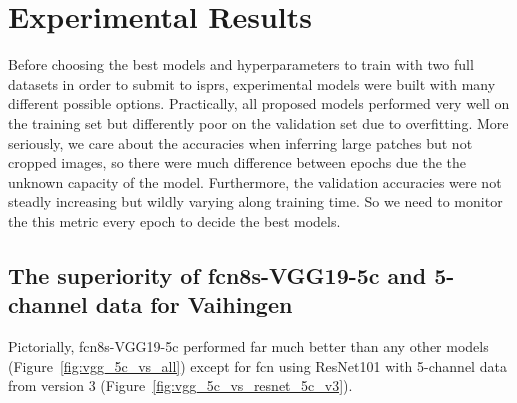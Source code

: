 \section{Experimental Results}
Before choosing the best models and hyperparameters to train with two full
datasets in order to submit to \acrshort{isprs}, experimental models were built
with many different possible options. Practically, all proposed models performed
very well on the training set but differently poor on the validation set due to
overfitting. More seriously, we care about the accuracies when inferring large
patches but not cropped images, so there were much difference between epochs
due the the unknown capacity of the model. Furthermore, the validation
accuracies were not steadly increasing but wildly varying along training time.
So we need to monitor the this metric every epoch to decide the best models.

\subsection{The superiority of \acrshort{fcn}8s-VGG19-5c and 5-channel data for
Vaihingen}
Pictorially, \acrshort{fcn}8s-VGG19-5c performed far much better than any
other models (Figure~\ref{fig:vgg_5c_vs_all}) except for \acrshort{fcn} using
ResNet101 with 5-channel data from version 3
(Figure~\ref{fig:vgg_5c_vs_resnet_5c_v3}).


